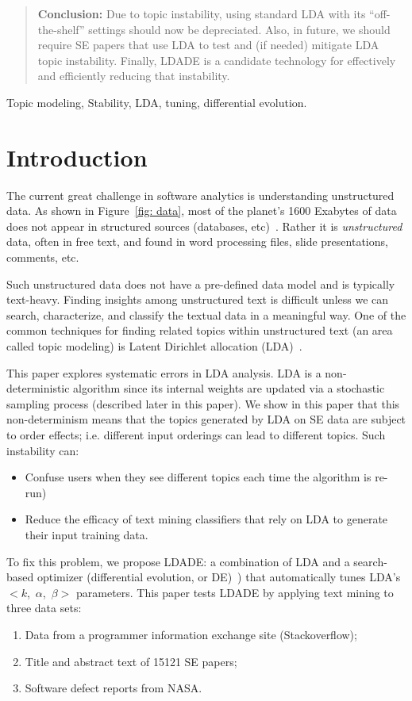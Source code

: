 \documentclass[twocolumn,5p,sort&compress]{elsarticle}
\newcommand{\bi}{\begin{itemize}}
\newcommand{\ei}{\end{itemize}}
\newcommand{\be}{\begin{enumerate}}
\newcommand{\ee}{\end{enumerate}}
\theoremstyle{break}
\begin{document}
\begin{frontmatter}
\begin{abstract}
\noindent
\textbf{Conclusion:}
  Due to topic instability,
  using standard LDA with its ``off-the-shelf'' settings should now be depreciated.
  Also, in future,
we should require
SE
papers that use
LDA
to
test and (if needed) mitigate LDA topic instability.
  Finally, LDADE is a candidate technology for effectively and efficiently reducing that instability.  
\end{abstract}

\begin{keyword}
Topic modeling, Stability, LDA, tuning, differential evolution.
\end{keyword}

\end{frontmatter}



\section{Introduction}
\label{sect:intro} 

The current great challenge in software analytics
is understanding unstructured data. As shown in Figure~\ref{fig:
data}, most of the planet's 1600 Exabytes of data does not appear
in structured sources (databases, etc)~\cite{nadkarni2014structured}.
Rather it is {\em unstructured} data, often in free text, and found
in word processing files, slide presentations, comments, etc.

Such unstructured data does not have a pre-defined data model and
is typically text-heavy. Finding insights among unstructured text
is  difficult unless we can search, characterize, and classify the
textual data in a meaningful way. One of the common techniques for
finding related topics within unstructured text (an area called
topic modeling) is Latent Dirichlet allocation (LDA)~\cite{blei2003latent}.

This paper explores systematic errors in LDA analysis.
LDA is a non-deterministic algorithm since its internal weights are updated via a stochastic sampling process (described
later in this paper).
We show in this paper that this non-determinism means that the  topics generated by LDA on
SE data are subject to order effects; i.e. different input orderings
can lead to different topics.
Such instability can:
\bi
\item
  Confuse users when they see different topics each time
the algorithm is re-run) 
\item
  Reduce the efficacy of text mining classifiers that rely on LDA to
  generate their input training data.
\ei
To fix this problem,
we propose LDADE: a  combination of LDA and a search-based optimizer (differential evolution, or DE)~\cite{storn1997differential})
that automatically tunes LDA's \mbox{$<k$, $\alpha$, $\beta>$} parameters. This paper tests LDADE 
by applying text mining to
three data sets:
\be
\item Data from a programmer information exchange site (Stackoverflow);
  \item Title and abstract text of
    15121 SE papers;
  \item Software defect reports from NASA.
\ee
    
\end{document}
